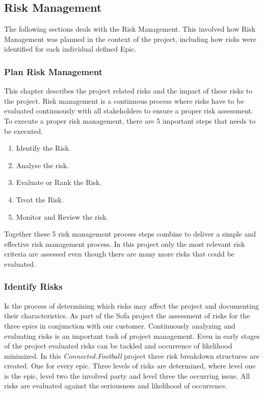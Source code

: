 
\subsection{Risk Management}
\label{ssec:risk_management}

The following sections deals with the Risk Management. This involved how Risk Management was planned in the context of the project, including how risks were identified for each individual defined Epic.

\subsubsection{Plan Risk Management}
\label{sssec:plan_risk_management}

This chapter describes the project related risks and the impact of these risks to the project. Risk management is a continuous process where risks have to be evaluated continuously with all stakeholders to ensure a proper risk assessment. To execute a proper risk management, there are 5 important steps that needs to be executed.

\begin{enumerate}
    \item Identify the Risk.
    \item Analyse the risk.
    \item Evaluate or Rank the Risk.
    \item Treat the Risk.
    \item Monitor and Review the risk.
\end{enumerate}

Together these 5 risk management process steps combine to deliver a simple and effective risk management process.
In this project only the most relevant risk criteria are assessed even though there are many more risks that could be evaluated.

\subsubsection{Identify Risks}
\label{sssec:identify_risks}

Is the process of determining which risks may affect the project and documenting their characteristics.
As part of the Sofa project the assessment of risks for the three epics in conjunction with our customer.
Continuously analyzing and evaluating risks is an important task of project management. Even in early stages of the project evaluated risks can be tackled and occurrence of likelihood minimized.
In this \textit{Connected.Football} project three risk breakdown structures are created.
One for every epic. Three levels of risks are determined, where level one is the epic, level two the involved party and level three the occurring issue. All risks are evaluated against the seriousness and likelihood of occurrence.

